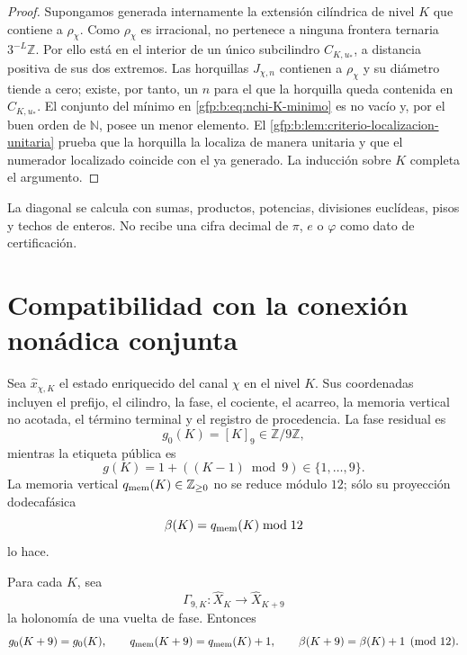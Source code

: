 \begin{proof}
Supongamos generada internamente la extensión cilíndrica de nivel \(K\) que contiene a
\(\rho_\chi\). Como \(\rho_\chi\) es irracional, no pertenece a ninguna
frontera ternaria \(3^{-L}\mathbb Z\). Por ello está en el interior de un
único subcilindro \(C_{K,u_*}\), a distancia positiva de sus dos extremos.
Las horquillas \(J_{\chi,n}\) contienen a \(\rho_\chi\) y su diámetro
tiende a cero; existe, por tanto, un \(n\) para el que la horquilla queda
contenida en \(C_{K,u_*}\). El conjunto del mínimo en
\eqref{gfp:b:eq:nchi-K-minimo} es no vacío y, por el buen orden de
\(\mathbb N\), posee un menor elemento. El
\cref{gfp:b:lem:criterio-localizacion-unitaria} prueba que la horquilla la
localiza de manera unitaria y que el numerador localizado coincide con el ya
generado. La inducción sobre \(K\) completa el argumento.
\end{proof}

\begin{corollary}
La diagonal se calcula con sumas, productos, potencias, divisiones euclídeas,
pisos y techos de enteros. No recibe una cifra decimal de \(\pi\), \(e\) o
\(\varphi\) como dato de certificación.
\end{corollary}

\section{Compatibilidad con la conexión nonádica conjunta}

Sea \(\widehat x_{\chi,K}\) el estado enriquecido del canal \(\chi\) en
el nivel \(K\). Sus coordenadas incluyen el prefijo, el cilindro, la fase,
el cociente, el acarreo, la memoria vertical no acotada, el término terminal
y el registro de procedencia. La fase residual es
\[
 g_0(K)=[K]_9\in\mathbb Z/9\mathbb Z,
\]
mientras la etiqueta pública es
\[
 g(K)=1+((K-1)\bmod9)\in\{1,\ldots,9\}.
\]
La memoria vertical \(q_{\rm mem}(K)\in\mathbb Z_{\geq0}\) no se reduce
módulo \(12\); sólo su proyección dodecafásica
\[
 \beta(K)=q_{\rm mem}(K)\bmod12
\]
lo hace.

Para cada \(K\), sea
\[
 \Gamma_{9,K}:\widehat X_K\longrightarrow\widehat X_{K+9}
\]
la holonomía de una vuelta de fase. Entonces
\[
 g_0(K+9)=g_0(K),
 \qquad
 q_{\rm mem}(K+9)=q_{\rm mem}(K)+1,
 \qquad
 \beta(K+9)=\beta(K)+1\pmod{12}.
\]

